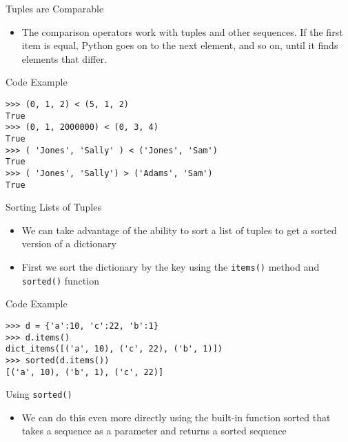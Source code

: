 \documentclass[serif, aspectratio=169]{beamer}
\begin{document}
\begin{frame}{Tuples are Comparable}
    \begin{itemize}
        \item The comparison operators work with tuples and other sequences. If the first item is equal, Python goes on to the next element,  and so on, until it finds elements that differ.
    \end{itemize}
\end{frame}

\begin{frame}[fragile]{Code Example}
    \begin{lstlisting}
>>> (0, 1, 2) < (5, 1, 2)
True
>>> (0, 1, 2000000) < (0, 3, 4)
True
>>> ( 'Jones', 'Sally' ) < ('Jones', 'Sam')
True
>>> ( 'Jones', 'Sally') > ('Adams', 'Sam')
True
    \end{lstlisting}
\end{frame}

\begin{frame}{Sorting Lists of Tuples}
    \begin{itemize}
        \item We can take advantage of the ability to sort a list of tuples to get a sorted version of a dictionary
        \item First we sort the dictionary by the key using the \texttt{\color{red}items()} method and \texttt{\color{red}sorted()} function
        
    \end{itemize}
\end{frame}

\begin{frame}[fragile]{Code Example}
    \begin{lstlisting}
>>> d = {'a':10, 'c':22, 'b':1}
>>> d.items()
dict_items([('a', 10), ('c', 22), ('b', 1)])
>>> sorted(d.items())
[('a', 10), ('b', 1), ('c', 22)]

    \end{lstlisting}
\end{frame}

\begin{frame}{Using \texttt{\color{red}sorted()}}
    \begin{itemize}
        \item We can do this even more directly using the built-in function sorted that takes a sequence as a parameter and returns a sorted sequence
        
    \end{itemize}
\end{frame}
\end{document}
